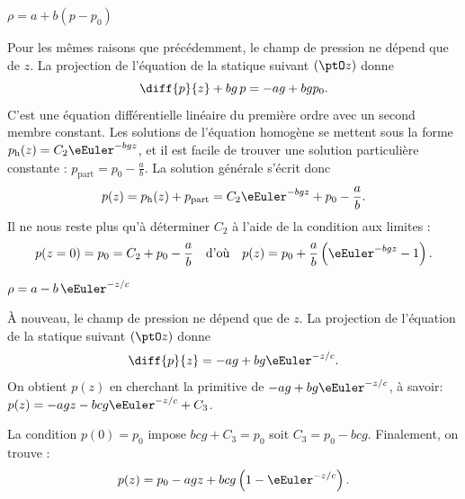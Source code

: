 

\begin{enonce}
$\rho=a+b(p-p_0)$
\end{enonce}


\begin{corrige}
Pour les mêmes raisons que précédemment, le champ de pression ne dépend que de $z$. La projection de l'équation de la statique suivant $(\ptO z)$ donne 
\[
\diff{p}{z}	+bg\,p=-ag+bgp_0.
\]
C'est une équation différentielle linéaire du première ordre avec un second membre constant. Les solutions de l'équation homogène se mettent sous la forme $p_\text{h}(z)=C_2\eEuler^{-bgz}$, et il est facile de trouver une solution particulière constante : $p_\text{part}=p_0-\frac{a}{b}$. La solution générale s'écrit donc 
\[
p(z)=p_\text{h}(z)+p_\text{part}=C_2\eEuler^{-bgz}+p_0-\frac{a}{b}.
\]
Il ne nous reste plus qu'à déterminer $C_2$ à l'aide de la condition aux limites :
\[
p(z=0)=p_0=C_2+p_0-\frac{a}{b}
\quad\text{d'où}\quad
p(z)=p_0+\frac{a}{b}\left(\eEuler^{-bgz}-1\right).
\]
\end{corrige}


\begin{enonce}
$\rho=a-b\,\eEuler^{-z/c}$
\end{enonce}


\begin{corrigeNewpage}
À nouveau, le champ de pression ne dépend que de $z$. La projection de l'équation de la statique suivant $(\ptO z)$ donne 
\[
\diff{p}{z}=-ag+bg\eEuler^{-z/c}.
\]
On obtient $p(z)$ en cherchant la primitive de $-ag+bg\eEuler^{-z/c}$, à savoir: $p(z)=-agz-bcg\eEuler^{-z/c}+C_3$.

La condition $p(0)=p_0$ impose $bcg+C_3=p_0$ soit $C_3=p_0-bcg$. Finalement, on trouve :
\[
p(z)=p_0-agz+bcg\left(1-\eEuler^{-z/c}\right).
\]
\end{corrigeNewpage}



